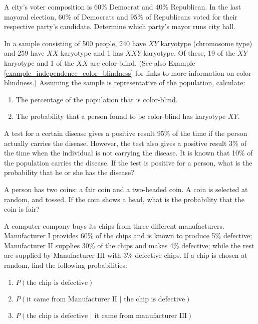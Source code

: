 \begin{puzzle}
    A city's voter composition is 60\% Democrat and 40\% Republican. In the last mayoral election, 60\% of Democrats and 95\% of Republicans voted for their respective party's candidate. Determine which party's mayor runs city hall.
\end{puzzle}

\begin{puzzle}
    In a sample consisting of 500 people, 240 have $XY$ karyotype (chromosome type) and 259 have $XX$ karyotype and 1 has $XXY$ karyotype. Of these, 19 of the $XY$ karyotype and 1 of the $XX$ are color-blind. (See also Example \ref{example_independence_color_blindness} for links to more information on color-blindness.) Assuming the sample is representative of the population, calculate:
    \begin{enumerate}
        \item The percentage of the population that is color-blind.
        \item The probability that a person found to be color-blind has karyotype $XY$.
    \end{enumerate}
\end{puzzle}

\begin{puzzle}
    A test for a certain disease gives a positive result 95\% of the time if the person actually carries the disease. However, the test also gives a positive result 3\% of the time when the individual is not carrying the disease. It is known that 10\% of the population carries the disease. If the test is positive for a person, what is the probability that he or she has the disease?
\end{puzzle}

\begin{puzzle}
    A person has two coins: a fair coin and a two-headed coin. A coin is selected at random, and tossed. If the coin shows a head, what is the probability that the coin is fair?
\end{puzzle}

\begin{puzzle}
    A computer company buys its chips from three different manufacturers. Manufacturer I provides 60\% of the chips and is known to produce 5\% defective; Manufacturer II supplies 30\% of the chips and makes 4\% defective; while the rest are supplied by Manufacturer III with 3\% defective chips. If a chip is chosen at random, find the following probabilities:
    \begin{enumerate}
        \item \( P(\text{the chip is defective}) \)
        \item \( P(\text{it came from Manufacturer II } | \text{ the chip is defective}) \)
        \item \( P(\text{the chip is defective } | \text{ it came from manufacturer III}) \)
    \end{enumerate}
\end{puzzle}

